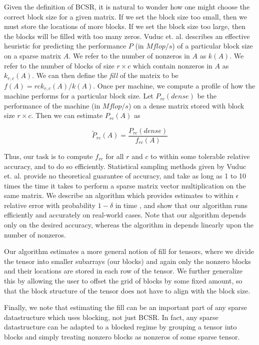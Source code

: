   Given the definition of BCSR, it is natural to wonder how one might choose the correct block size for a given matrix. If we set the block size too small, then we must store the locations of more blocks. If we set the block size too large, then the blocks will be filled with too many zeros.
  Vuduc et. al. describes an effective heuristic for predicting the performance $P$ (in $Mflop/s$) of a particular block size on a sparse matrix $A$.
  We refer to the number of nonzeros in $A$ as $k(A)$. We refer to the number of blocks of size $r \times c$ which contain nonzeros in $A$ as $k_{r, c}(A)$.
  We can then define the \textit{fill} of the matrix to be $f(A) = rck_{r, c}(A)/k(A)$.
  Once per machine, we compute a profile of how the machine performs for a particular block size.
  Let $P_{rc}(dense)$ be the performance of the machine (in $Mflop/s$) on a dense matrix stored with block size $r \times c$.
  Then we can estimate $P_{rc}(A)$ as

  \[
    \tilde{P}_{rc}(A) = \frac{P_{rc}(dense)}{f_{rc}(A)}
  \]

  Thus, our task is to compute $f_{rc}$ for all $r$ and $c$ to within some tolerable relative accuracy, and to do so efficiently. Statistical sampling methods given by Vuduc et. al. provide no theoretical guarantee of accuracy, and take as long as 1 to 10 times the time it takes to perform a sparse matrix vector multiplication on the same matrix. We describe an algorithm which provides estimates to within $\epsilon$ relative error with probability $1 - \delta$ in time , and show that our algorithm runs efficiently and accurately on real-world cases. Note that our algorithm depends only on the desired accuracy, whereas the algorithm in \cite{vuduc04} depends linearly upon the number of nonzeros.

  Our algorithm estimates a more general notion of fill for tensors, where we divide the tensor into smaller subarrays (our blocks) and again only the nonzero blocks and their locations are stored in each row of the tensor. We further generalize this by allowing the user to offset the grid of blocks by some fixed amount, so that the block structure of the tensor does not have to align with the block size.

  Finally, we note that estimating the fill can be an important part of any sparse datastructure which uses blocking, not just BCSR. In fact, any sparse datastructure can be adapted to a blocked regime by grouping a tensor into blocks and simply treating nonzero blocks as nonzeros of some sparse tensor.
